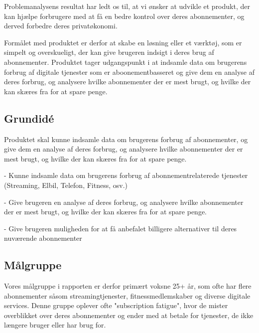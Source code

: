 

Problemanalysens resultat har ledt os til, at vi ønsker at udvikle et produkt, der kan hjælpe forbrugere med at få en bedre kontrol over deres abonnementer, og derved forbedre deres privatøkonomi.

Formålet med produktet er derfor at skabe en løsning eller et værktøj, som er simpelt og overskueligt, der kan give brugeren indsigt i deres brug af abonnementer. Produktet tager udgangspunkt i at indsamle data om brugerens forbrug af digitale tjenester som er aboonementbasseret og give dem en analyse af deres forbrug, og  analysere hvilke abonnementer der er mest brugt, og hvilke der kan skæres fra for at spare penge. 

\subsection{Grundidé}
Produktet skal kunne indsamle data om brugerens forbrug af abonnementer, og give dem en analyse af deres forbrug, og analysere hvilke abonnementer der er mest brugt, og hvilke der kan skæres fra for at spare penge.

- Kunne indsamle data om brugerens forbrug af abonnementrelaterede tjenester (Streaming, Elbil, Telefon, Fitness, osv.)

- Give brugeren en analyse af deres forbrug, og analysere hvilke abonnementer der er mest brugt, og hvilke der kan skæres fra for at spare penge.

- Give brugeren muligheden for at få anbefalet billigere alternativer til deres nuværende abonnementer


\subsection{Målgruppe}\label{sec:målgruppe}
Vores målgruppe i rapporten er derfor primært voksne 25+ år, som ofte har flere abonnementer såsom streamingtjenester, fitnessmedlemskaber og diverse digitale services. Denne gruppe oplever ofte "subscription fatigue", hvor de mister overblikket over deres abonnementer og ender med at betale for tjenester, de ikke længere bruger eller har brug for.


